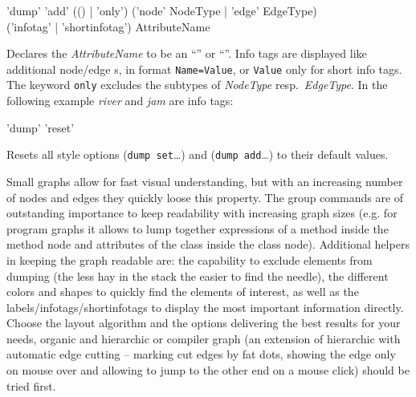 \begin{rail}
  'dump' 'add' (() | 'only') ('node' NodeType | 'edge' EdgeType) \\ ('infotag' | 'shortinfotag') AttributeName
\end{rail}
Declares the  \emph{AttributeName} to be an ``'' or ``''.
Info tags are displayed like additional node/edge s, in format \texttt{Name=Value}, or \texttt{Value} only for short info tags. 
The keyword \texttt{only} excludes the subtypes of \emph{NodeType} resp.\ \emph{EdgeType}. 
In the following example \emph{river} and \emph{jam} are info tags:
\begin{center}
\end{center}

\begin{rail}
  'dump' 'reset'
\end{rail}
Resets all style options (\texttt{dump set}\dots) and (\texttt{dump add}\dots) to their default values.


\begin{note}
Small graphs allow for fast visual understanding, but with an increasing number of nodes and edges they quickly loose this property.
The group commands are of outstanding importance to keep readability with increasing graph sizes
(e.g. for program graphs it allows to lump together expressions of a method inside the method node and attributes of the class inside the class node).
Additional helpers in keeping the graph readable are: 
the capability to exclude elements from dumping (the less hay in the stack the easier to find the needle),
the different colors and shapes to quickly find the elements of interest,
as well as the labels/infotags/shortinfotags to display the most important information directly. 
Choose the layout algorithm and the options delivering the best results for your needs, organic and hierarchic or compiler graph 
(an extension of hierarchic with automatic edge cutting -- marking cut edges by fat dots, showing the edge only on mouse over and allowing to jump to the other end on a mouse click)
should be tried first.
\end{note}

